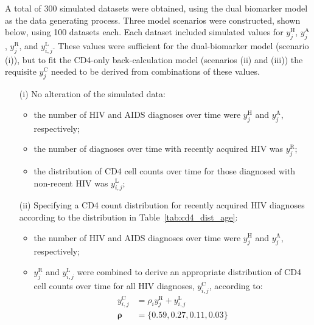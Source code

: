 A total of 300 simulated datasets were obtained, using the dual biomarker model as the data generating process. Three model scenarios were constructed, shown below, using 100 datasets each. Each dataset included simulated values for $y^\text{H}_j$, $y^\text{A}_j$, $y^\text{R}_j$, and $y^\text{L}_{i,j}$. These values were sufficient for the dual-biomarker model (scenario (i)), but to fit the CD4-only back-calculation model (scenarios (ii) and (iii)) the requisite $y^\text{C}_j$ needed to be derived from combinations of these values.
%
\begin{enumerate}
  \item[(i)] No alteration of the simulated data:
        \begin{itemize}
          \item the number of HIV and AIDS diagnoses over time were $y^\text{H}_j$ and $y^\text{A}_j$, respectively;
          \item the number of diagnoses over time with recently acquired HIV was $y^\text{R}_j$;
          \item the distribution of CD4 cell counts over time for those diagnosed with non-recent HIV was $y^\text{L}_{i,j}$;
        \end{itemize}

  \item[(ii)] Specifying a CD4 count distribution for recently acquired HIV diagnoses according to the distribution in Table~\ref{tab:cd4_dist_age}:
        \begin{itemize}
          \item the number of HIV and AIDS diagnoses over time were $y^\text{H}_j$ and $y^\text{A}_j$, respectively;
          \item $y^\text{R}_{j}$ and $y^\text{L}_{i,j}$ were combined to derive an appropriate distribution of CD4 cell counts over time for all HIV diagnoses, $y^\text{C}_{i,j}$, according to:
                \begin{align*}
                  y^\text{C}_{i,j} & = \rho_i y^\text{R}_{j} + y^\text{L}_{i,j} \\
                  \bm{\rho}        & = \{0.59, 0.27, 0.11, 0.03\}
                \end{align*}
        \end{itemize}


\end{enumerate}
